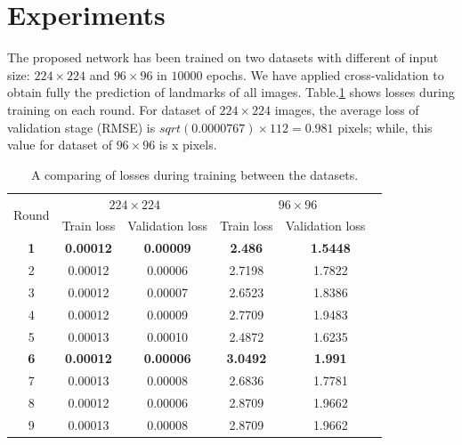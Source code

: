 \documentclass[12pt,a4paper]{article}
\begin{document}
\section{Experiments}
The proposed network has been trained on two datasets with different of input size: $224 \times 224$ and $96 \times 96$ in $10000$ epochs. We have applied cross-validation to obtain fully the prediction of landmarks of all images. Table.\ref{tab2} shows losses during training on each round.
For dataset of $224 \times 224$ images, the average loss of validation stage (RMSE) is \textit{$sqrt(0.0000767) \times 112 = 0.981$} pixels; while, this value for dataset of $96 \times 96$ is x pixels.

\begin{table}[htbp]
\centering
\begin{tabular}{ | c | c | c | c | c | }
\hline
	\multicolumn{1}{|c|}{\multirow{2}{*}{Round}} & \multicolumn{2}{c|}{$224 \times 224$} &  \multicolumn{2}{c|}{$96 \times 96$}  \\ \cline{2-5}
	 & Train loss & Validation loss & Train loss & Validation loss \  \\ \hline
	\textbf{1} & \textbf{0.00012} & \textbf{0.00009} & \textbf{2.486} & \textbf{1.5448} \\ \hline
	2 & 0.00012 & 0.00006 & 2.7198 & 1.7822 \\ \hline
	3 & 0.00012 & 0.00007 & 2.6523 & 1.8386 \\ \hline
	4 & 0.00012 & 0.00009 & 2.7709 & 1.9483 \\ \hline
	5 & 0.00013 & 0.00010 & 2.4872 & 1.6235 \\ \hline
	\textbf{6} & \textbf{0.00012} & \textbf{0.00006} & \textbf{3.0492} & \textbf{1.991} \\ \hline
	7 & 0.00013 & 0.00008 & 2.6836 & 1.7781 \\ \hline
	8 & 0.00012 & 0.00006 & 2.8709 & 1.9662 \\ \hline
	9 & 0.00013 & 0.00008 & 2.8709 & 1.9662 \\ \hline
\end{tabular}
\caption{\small{A comparing of losses during training between the datasets.}}
\label{tab2}
\end{table}
\end{document}
